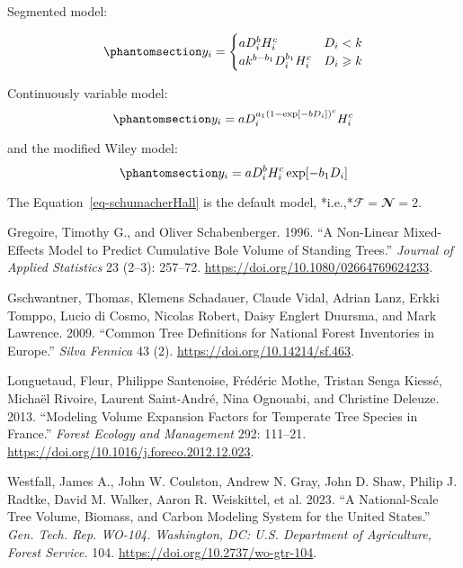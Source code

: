 \documentclass[
  letterpaper,
  DIV=11,
  numbers=noendperiod]{scrartcl}
\newlength{\cslhangindent}
\newenvironment{CSLReferences}[2] %
 {\begin{list}{}{%
  \setlength{\itemindent}{0pt}
  \setlength{\leftmargin}{0pt}
  \setlength{\parsep}{0pt}
  \ifodd #1
   \setlength{\leftmargin}{\cslhangindent}
   \setlength{\itemindent}{-1\cslhangindent}
  \fi
  \setlength{\itemsep}{#2\baselineskip}}}
 {\end{list}}
\newcommand{\ie}{*i.e.,*}
\newcommand{\F}{\mathscr{F}}
\newcommand{\N}{\mathbfscr{N}}
\begin{document}
Segmented model:

\begin{equation}\phantomsection\label{eq-cases}{
y_i =
\begin{cases}
    a D_i^b H_i^c & D_i < k \\
    a k^{b - b_1} D_i^{b_1} H_i^c & D_i \geqslant k
\end{cases}
}\end{equation}

Continuously variable model:
\begin{equation}\phantomsection\label{eq-continuous}{
y_i = a D_i^{a_1(1 - \exp[-b D_i])^c} H_i^c
}\end{equation}

and the modified Wiley model:
\begin{equation}\phantomsection\label{eq-wiley}{
y_i = a D_i^b H_i^c \exp[-b_1 D_i]
}\end{equation}

The Equation~\ref{eq-schumacherHall} is the default model,
\ie \(\F = \N = 2\).

\label{refs}
\begin{CSLReferences}{1}{0}
Gregoire, Timothy G., and Oliver Schabenberger. 1996. {``A Non-Linear
Mixed-Effects Model to Predict Cumulative Bole Volume of Standing
Trees.''} \emph{Journal of Applied Statistics} 23 (2--3): 257--72.
\url{https://doi.org/10.1080/02664769624233}.

Gschwantner, Thomas, Klemens Schadauer, Claude Vidal, Adrian Lanz, Erkki
Tomppo, Lucio di Cosmo, Nicolas Robert, Daisy Englert Duursma, and Mark
Lawrence. 2009. {``Common Tree Definitions for National Forest
Inventories in Europe.''} \emph{Silva Fennica} 43 (2).
\url{https://doi.org/10.14214/sf.463}.

Longuetaud, Fleur, Philippe Santenoise, Frédéric Mothe, Tristan Senga
Kiessé, Michaël Rivoire, Laurent Saint-André, Nina Ognouabi, and
Christine Deleuze. 2013. {``Modeling Volume Expansion Factors for
Temperate Tree Species in France.''} \emph{Forest Ecology and
Management} 292: 111--21.
\url{https://doi.org/10.1016/j.foreco.2012.12.023}.

Westfall, James A., John W. Coulston, Andrew N. Gray, John D. Shaw,
Philip J. Radtke, David M. Walker, Aaron R. Weiskittel, et al. 2023.
{``A National-Scale Tree Volume, Biomass, and Carbon Modeling System for
the United States.''} \emph{Gen. Tech. Rep. WO-104. Washington, DC: U.S.
Department of Agriculture, Forest Service.} 104.
\url{https://doi.org/10.2737/wo-gtr-104}.

\end{CSLReferences}
\end{document}
